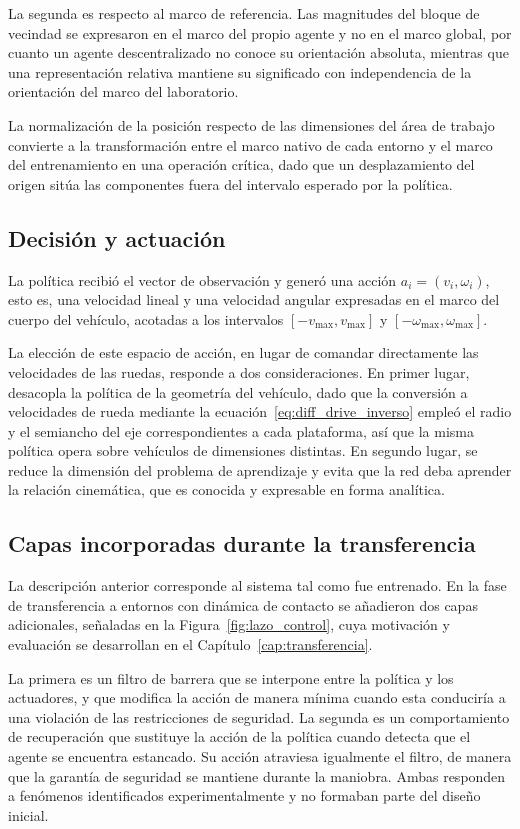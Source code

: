 La segunda es respecto al marco de referencia. Las magnitudes del bloque de vecindad se expresaron en el marco del propio agente y no en el marco global, por cuanto un agente descentralizado no conoce su orientación absoluta, mientras que una representación relativa mantiene su significado con independencia de la orientación del marco del laboratorio.

La normalización de la posición respecto de las dimensiones del área de trabajo convierte a la transformación entre el marco nativo de cada entorno y el marco del entrenamiento en una operación crítica, dado que un desplazamiento del origen sitúa las componentes fuera del intervalo esperado por la política.

\subsection*{Decisión y actuación}

La política recibió el vector de observación y generó una acción $a_i = (v_i, \omega_i)$, esto es, una velocidad lineal y una velocidad angular expresadas en el marco del cuerpo del vehículo, acotadas a los intervalos $[-v_{\max}, v_{\max}]$ y $[-\omega_{\max}, \omega_{\max}]$.

La elección de este espacio de acción, en lugar de comandar directamente las velocidades de las ruedas, responde a dos consideraciones. En primer lugar, desacopla la política de la geometría del vehículo, dado que la conversión a velocidades de rueda mediante la ecuación~\eqref{eq:diff_drive_inverso} empleó el radio y el semiancho del eje correspondientes a cada plataforma, así que la misma política opera sobre vehículos de dimensiones distintas. En segundo lugar, se reduce la dimensión del problema de aprendizaje y evita que la red deba aprender la relación cinemática, que es conocida y expresable en forma analítica.

\subsection*{Capas incorporadas durante la transferencia}

La descripción anterior corresponde al sistema tal como fue entrenado. En la fase de transferencia a entornos con dinámica de contacto se añadieron dos capas adicionales, señaladas en la Figura~\ref{fig:lazo_control}, cuya motivación y evaluación se desarrollan en el Capítulo~\ref{cap:transferencia}.

La primera es un filtro de barrera que se interpone entre la política y los actuadores, y que modifica la acción de manera mínima cuando esta conduciría a una violación de las restricciones de seguridad. La segunda es un comportamiento de recuperación que sustituye la acción de la política cuando detecta que el agente se encuentra estancado. Su acción atraviesa igualmente el filtro, de manera que la garantía de seguridad se mantiene durante la maniobra. Ambas responden a fenómenos identificados experimentalmente y no formaban parte del diseño inicial.

